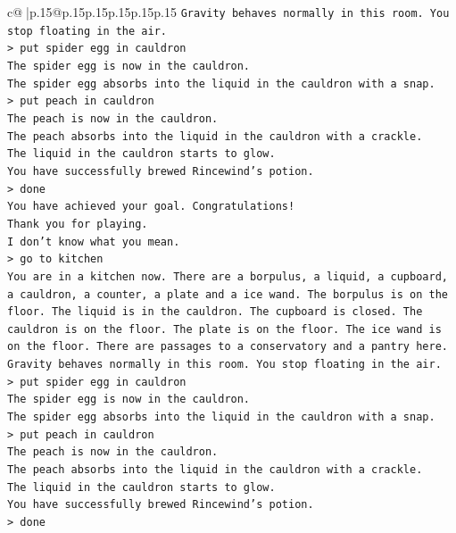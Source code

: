 \documentclass{article}
\begin{document}
{\begin{supertabular}{c@{$\;$}|p{.15\linewidth}@{}p{.15\linewidth}p{.15\linewidth}p{.15\linewidth}p{.15\linewidth}p{.15\linewidth}}
{{{\texttt{Gravity behaves normally in this room. You stop floating in the air.} \\
\texttt{> put spider egg in cauldron} \\
\texttt{The spider egg is now in the cauldron.} \\
\texttt{The spider egg absorbs into the liquid in the cauldron with a snap.} \\
\texttt{> put peach in cauldron} \\
\texttt{The peach is now in the cauldron.} \\
\texttt{The peach absorbs into the liquid in the cauldron with a crackle.} \\
\texttt{The liquid in the cauldron starts to glow.} \\
\texttt{You have successfully brewed Rincewind's potion.} \\
\texttt{> done} \\
\texttt{You have achieved your goal. Congratulations!} \\
\texttt{Thank you for playing.} \\
\texttt{I don't know what you mean.} \\
\texttt{> go to kitchen} \\
\texttt{You are in a kitchen now. There are a borpulus, a liquid, a cupboard, a cauldron, a counter, a plate and a ice wand. The borpulus is on the floor. The liquid is in the cauldron. The cupboard is closed. The cauldron is on the floor. The plate is on the floor. The ice wand is on the floor. There are passages to a conservatory and a pantry here.} \\
\texttt{Gravity behaves normally in this room. You stop floating in the air.} \\
\texttt{> put spider egg in cauldron} \\
\texttt{The spider egg is now in the cauldron.} \\
\texttt{The spider egg absorbs into the liquid in the cauldron with a snap.} \\
\texttt{> put peach in cauldron} \\
\texttt{The peach is now in the cauldron.} \\
\texttt{The peach absorbs into the liquid in the cauldron with a crackle.} \\
\texttt{The liquid in the cauldron starts to glow.} \\
\texttt{You have successfully brewed Rincewind's potion.} \\
\texttt{> done} \\
}}}
\end{supertabular}}
\end{document}
